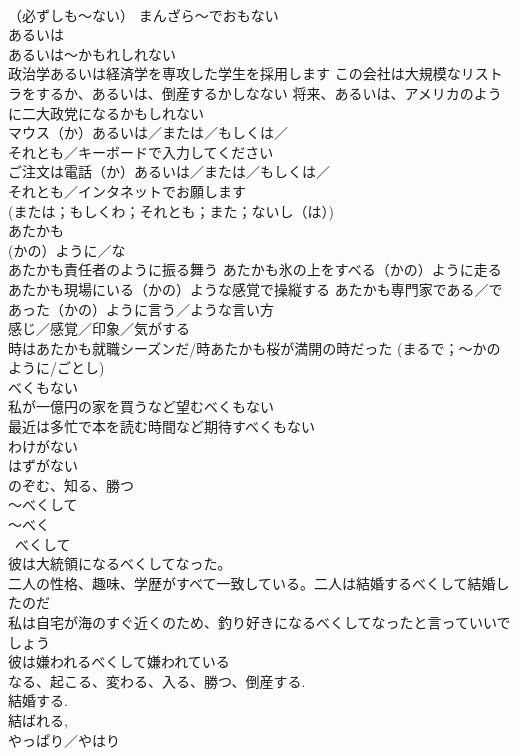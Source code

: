 \documentclass[8pt]{extreport}
\begin{document}
\begin{CJK}{UTF8}{min}
\\	（必ずしも～ない） まんざら～でおもない
\\	あるいは 
\\	あるいは～かもれしれない	
\\	政治学あるいは経済学を専攻した学生を採用します この会社は大規模なリストラをするか、あるいは、倒産するかしなない 将来、あるいは、アメリカのように二大政党になるかもしれない 
\\	マウス（か）あるいは／または／もしくは／
\\	それとも／キーボードで入力してください
\\	ご注文は電話（か）あるいは／または／もしくは／
\\	それとも／インタネットでお願します
\\	(または；もしくわ；それとも；また；ないし（は）)
\\	あたかも 
\\	(かの）ように／な
\\	あたかも責任者のように振る舞う あたかも氷の上をすべる（かの）ように走る あたかも現場にいる（かの）ような感覚で操縦する あたかも専門家である／であった（かの）ように言う／ような言い方 
\\	感じ／感覚／印象／気がする 
\\	時はあたかも就職シーズンだ/時あたかも桜が満開の時だった	(まるで；～かのように/ごとし)
\\	べくもない 
\\	私が一億円の家を買うなど望むべくもない 
\\	最近は多忙で本を読む時間など期待すべくもない 
\\	わけがない 
\\	はずがない 
\\	のぞむ、知る、勝つ 
\\	～べくして 
\\	～べく 
\\	~べくして~
\\	彼は大統領になるべくしてなった。 
\\	二人の性格、趣味、学歴がすべて一致している。二人は結婚するべくして結婚したのだ 
\\	私は自宅が海のすぐ近くのため、釣り好きになるべくしてなったと言っていいでしょう 
\\	彼は嫌われるべくして嫌われている 
\\	なる、起こる、変わる、入る、勝つ、倒産する. 
\\	結婚する. 
\\	結ばれる,
\\	やっぱり／やはり 

\end{CJK}
\end{document}
